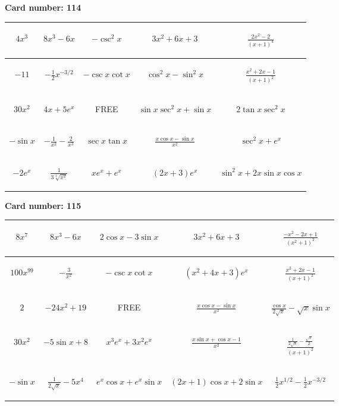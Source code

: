 \documentclass{article}
\newcommand{\entry}[1]{\begin{minipage}[t][2.75cm][t]{4cm} \vspace{1cm} \begin{center}#1\end{center} \end{minipage}}
\newcommand{\freespace}{\entry{FREE}}
\newcommand{\cardnumber}[1]{\noindent \textbf{Card number: #1} \bigskip}
\begin{document}
\pagebreak

\cardnumber{114}
\begin{center}
\begin{tabular}{|*{5}{c|}}
    \hline
    \entry{$4x^3$} & \entry{$8x^3 - 6x$} & \entry{$-\csc^2 x$} & \entry{$3x^2 + 6x + 3$} & \entry{$\frac{2x^2 - 2}{(x + 1)^4}$} \\ \hline
    \entry{$-11$} & \entry{$-\frac{1}{2} x^{-3/2}$} & \entry{$-\csc x \cot x$} & \entry{$\cos^2 x - \sin^2 x$} & \entry{$\frac{x^2 + 2x - 1}{(x + 1)^2}$} \\ \hline
    \entry{$30x^2$} & \entry{$4x + 5e^x$} & \freespace & \entry{$\sin x \sec^2 x + \sin x$} & \entry{$2 \tan x \sec^2 x$} \\ \hline
    \entry{$-\sin x$} & \entry{$-\frac{1}{x^2} - \frac{2}{x^3}$} & \entry{$\sec x \tan x$} & \entry{$\frac{x \cos x - \sin x}{x^2}$} & \entry{$\sec^2 x + e^x$} \\ \hline
    \entry{$-2e^x$} & \entry{$\frac{1}{3\sqrt[3]{x^2}}$} & \entry{$x e^x + e^x$} & \entry{$(2x + 3) e^x$} & \entry{$\sin^2 x + 2x \sin x \cos x$} \\ \hline
\end{tabular}
\end{center}

\pagebreak

\cardnumber{115}
\begin{center}
\begin{tabular}{|*{5}{c|}}
    \hline
    \entry{$8x^7$} & \entry{$8x^3 - 6x$} & \entry{$2 \cos x - 3 \sin x$} & \entry{$3x^2 + 6x + 3$} & \entry{$\frac{-x^2 - 2x + 1}{(x^2 + 1)^2}$} \\ \hline
    \entry{$100x^{99}$} & \entry{$-\frac{3}{x^2}$} & \entry{$-\csc x \cot x$} & \entry{$(x^2 + 4x + 3) e^x$} & \entry{$\frac{x^2 + 2x - 1}{(x + 1)^2}$} \\ \hline
    \entry{$2$} & \entry{$-24x^2 + 19$} & \freespace & \entry{$\frac{x \cos x - \sin x}{x^2}$} & \entry{$\frac{\cos x}{2 \sqrt{x}} - \sqrt{x} \sin x$} \\ \hline
    \entry{$30x^2$} & \entry{$-5 \sin x + 8$} & \entry{$x^3 e^x + 3x^2 e^x$} & \entry{$\frac{x \sin x + \cos x - 1}{x^2}$} & \entry{$\frac{\frac{1}{2 \sqrt{x}} - \frac{\sqrt{x}}{2}}{(x + 1)^2}$} \\ \hline
    \entry{$-\sin x$} & \entry{$\frac{1}{2\sqrt{x}} - 5x^4$} & \entry{$e^x \cos x + e^x \sin x$} & \entry{$(2x + 1) \cos x + 2 \sin x$} & \entry{$\frac{1}{2} x^{1/2} - \frac{1}{2} x^{-3/2}$} \\ \hline
\end{tabular}
\end{center}
\end{document}
